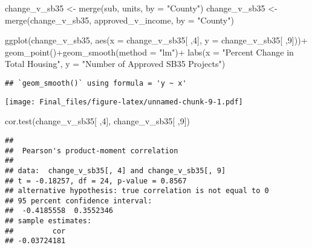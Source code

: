 \documentclass[
]{article}
\newenvironment{Shaded}{\begin{snugshade}}{\end{snugshade}}
\newcommand{\AttributeTok}[1]{\textcolor[rgb]{0.77,0.63,0.00}{#1}}
\newcommand{\DecValTok}[1]{\textcolor[rgb]{0.00,0.00,0.81}{#1}}
\newcommand{\FunctionTok}[1]{\textcolor[rgb]{0.00,0.00,0.00}{#1}}
\newcommand{\NormalTok}[1]{#1}
\newcommand{\OtherTok}[1]{\textcolor[rgb]{0.56,0.35,0.01}{#1}}
\newcommand{\SpecialCharTok}[1]{\textcolor[rgb]{0.00,0.00,0.00}{#1}}
\newcommand{\StringTok}[1]{\textcolor[rgb]{0.31,0.60,0.02}{#1}}
\begin{document}
\begin{Shaded}
\begin{Highlighting}[]
\NormalTok{change\_v\_sb35 }\OtherTok{\textless{}{-}} \FunctionTok{merge}\NormalTok{(sub, units, }\AttributeTok{by =} \StringTok{"County"}\NormalTok{)}
\NormalTok{change\_v\_sb35 }\OtherTok{\textless{}{-}} \FunctionTok{merge}\NormalTok{(change\_v\_sb35, approved\_v\_income, }\AttributeTok{by =} \StringTok{"County"}\NormalTok{)}

\FunctionTok{ggplot}\NormalTok{(change\_v\_sb35, }\FunctionTok{aes}\NormalTok{(}\AttributeTok{x =}\NormalTok{ change\_v\_sb35[ ,}\DecValTok{4}\NormalTok{], }\AttributeTok{y =}\NormalTok{ change\_v\_sb35[ ,}\DecValTok{9}\NormalTok{]))}\SpecialCharTok{+}
  \FunctionTok{geom\_point}\NormalTok{()}\SpecialCharTok{+}\FunctionTok{geom\_smooth}\NormalTok{(}\AttributeTok{method =} \StringTok{"lm"}\NormalTok{)}\SpecialCharTok{+}
  \FunctionTok{labs}\NormalTok{(}\AttributeTok{x =} \StringTok{"Percent Change in Total Housing"}\NormalTok{, }\AttributeTok{y =} \StringTok{"Number of Approved SB35 Projects"}\NormalTok{)}
\end{Highlighting}
\end{Shaded}

\begin{verbatim}
## `geom_smooth()` using formula = 'y ~ x'
\end{verbatim}

\texttt{[image: Final\_files/figure-latex/unnamed-chunk-9-1.pdf]}

\begin{Shaded}
\begin{Highlighting}[]
\FunctionTok{cor.test}\NormalTok{(change\_v\_sb35[ ,}\DecValTok{4}\NormalTok{], change\_v\_sb35[ ,}\DecValTok{9}\NormalTok{])}
\end{Highlighting}
\end{Shaded}

\begin{verbatim}
## 
##  Pearson's product-moment correlation
## 
## data:  change_v_sb35[, 4] and change_v_sb35[, 9]
## t = -0.18257, df = 24, p-value = 0.8567
## alternative hypothesis: true correlation is not equal to 0
## 95 percent confidence interval:
##  -0.4185558  0.3552346
## sample estimates:
##         cor 
## -0.03724181
\end{verbatim}
\end{document}
